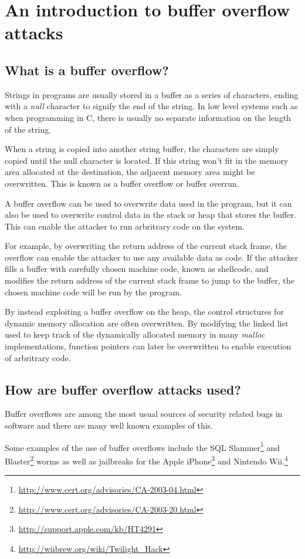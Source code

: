 \section{An introduction to buffer overflow attacks}
\subsection{What is a buffer overflow?}
Strings in programs are usually stored in a buffer as a series of characters,
ending with a \emph{null} character to signify the end of the string.
In low level systems such as when programming in C,
there is usually no separate information on the length of the string.

When a string is copied into another string buffer,
the characters are simply copied until the null character is located.
If this string won't fit in the memory area allocated at the destination,
the adjacent memory area might be overwritten.
This is known as a buffer overflow or buffer overrun.

A buffer overflow can be used to overwrite data used in the program,
but it can also be used to overwrite control data in the stack or heap
that stores the buffer.
This can enable the attacker to run arbritrary code on the system.

For example, by overwriting the return address of the current stack frame,
the overflow can enable the attacker to use any available data as code.
If the attacker fills a buffer with carefully chosen machine code,
known as shellcode,
and modifies the return address of the current stack frame
to jump to the buffer,
the chosen machine code will be run by the program.

By instead exploiting a buffer overflow on the heap,
the control structures for dynamic memory allocation are often overwritten.
By modifying the linked list used to keep track of
the dynamically allocated memory in many \emph{malloc} implementations,
function pointers can later be overwritten to enable
execution of arbritrary code.

\subsection{How are buffer overflow attacks used?}
Buffer overflows are among the most usual sources of
security related bugs in software and
there are many well known examples of this.

Some examples of the use of buffer overflows include the
SQL Slammer\footnote{\url{http://www.cert.org/advisories/CA-2003-04.html}}
and Blaster\footnote{\url{http://www.cert.org/advisories/CA-2003-20.html}}
worms as well as jailbreaks
for the Apple iPhone\footnote{\url{http://support.apple.com/kb/HT4291}}
and Nintendo Wii.\footnote{\url{http://wiibrew.org/wiki/Twilight_Hack}}

